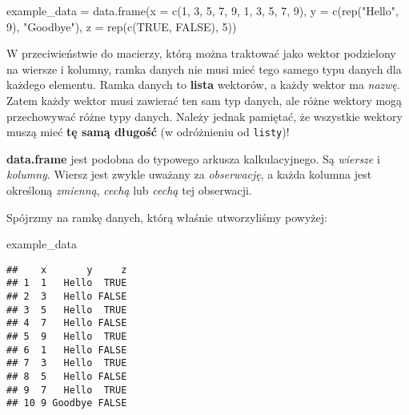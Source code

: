 \documentclass[
]{article}
\newenvironment{Shaded}{\begin{snugshade}}{\end{snugshade}}
\newcommand{\AttributeTok}[1]{\textcolor[rgb]{0.77,0.63,0.00}{#1}}
\newcommand{\ConstantTok}[1]{\textcolor[rgb]{0.00,0.00,0.00}{#1}}
\newcommand{\DecValTok}[1]{\textcolor[rgb]{0.00,0.00,0.81}{#1}}
\newcommand{\FunctionTok}[1]{\textcolor[rgb]{0.00,0.00,0.00}{#1}}
\newcommand{\NormalTok}[1]{#1}
\newcommand{\OtherTok}[1]{\textcolor[rgb]{0.56,0.35,0.01}{#1}}
\newcommand{\StringTok}[1]{\textcolor[rgb]{0.31,0.60,0.02}{#1}}
\begin{document}
\begin{Shaded}
\begin{Highlighting}[]
\NormalTok{example\_data }\OtherTok{=} \FunctionTok{data.frame}\NormalTok{(}\AttributeTok{x =} \FunctionTok{c}\NormalTok{(}\DecValTok{1}\NormalTok{, }\DecValTok{3}\NormalTok{, }\DecValTok{5}\NormalTok{, }\DecValTok{7}\NormalTok{, }\DecValTok{9}\NormalTok{, }\DecValTok{1}\NormalTok{, }\DecValTok{3}\NormalTok{, }\DecValTok{5}\NormalTok{, }\DecValTok{7}\NormalTok{, }\DecValTok{9}\NormalTok{),}
                          \AttributeTok{y =} \FunctionTok{c}\NormalTok{(}\FunctionTok{rep}\NormalTok{(}\StringTok{"Hello"}\NormalTok{, }\DecValTok{9}\NormalTok{), }\StringTok{"Goodbye"}\NormalTok{),}
                          \AttributeTok{z =} \FunctionTok{rep}\NormalTok{(}\FunctionTok{c}\NormalTok{(}\ConstantTok{TRUE}\NormalTok{, }\ConstantTok{FALSE}\NormalTok{), }\DecValTok{5}\NormalTok{))}
\end{Highlighting}
\end{Shaded}

W przeciwieństwie do macierzy, którą można traktować jako wektor
podzielony na wiersze i kolumny, ramka danych nie musi mieć tego samego
typu danych dla każdego elementu. Ramka danych to \textbf{lista}
wektorów, a każdy wektor ma \emph{nazwę}. Zatem każdy wektor musi
zawierać ten sam typ danych, ale różne wektory mogą przechowywać różne
typy danych. Należy jednak pamiętać, że wszystkie wektory muszą mieć
\textbf{tę samą długość} (w odróżnieniu od \texttt{listy})!

\begin{tip}
\textbf{data.frame} jest podobna do typowego arkusza kalkulacyjnego. Są
\emph{wiersze} i \emph{kolumny}. Wiersz jest zwykle uważany za
\emph{obserwację}, a każda kolumna jest określoną \emph{zmienną},
\emph{cechą} lub \emph{cechą} tej obserwacji.
\end{tip}

Spójrzmy na ramkę danych, którą właśnie utworzyliśmy powyżej:

\begin{Shaded}
\begin{Highlighting}[]
\NormalTok{example\_data}
\end{Highlighting}
\end{Shaded}

\begin{verbatim}
##    x       y     z
## 1  1   Hello  TRUE
## 2  3   Hello FALSE
## 3  5   Hello  TRUE
## 4  7   Hello FALSE
## 5  9   Hello  TRUE
## 6  1   Hello FALSE
## 7  3   Hello  TRUE
## 8  5   Hello FALSE
## 9  7   Hello  TRUE
## 10 9 Goodbye FALSE
\end{verbatim}
\end{document}
